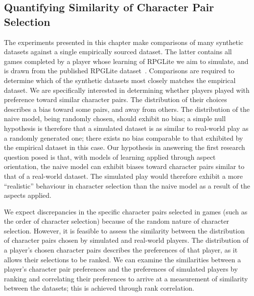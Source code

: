 \subsection{Quantifying Similarity of Character Pair Selection}
\label{measuring_charpair_similarity}

The experiments presented in this chapter make comparisons of many synthetic
datasets against a single empirically sourced dataset. The latter contains all games
completed by a player whose learning of RPGLite we aim to simulate, and is drawn
from the published RPGLite dataset~\cite{rpglite_dataset}. Comparisons are
required to determine which of the synthetic datasets most closely matches the
empirical dataset. We are specifically interested in determining whether players
played with preference toward similar character pairs. The distribution of their
choices describes a bias toward some pairs, and away from others. The
distribution of the naive model, being randomly chosen, should exhibit no bias;
a simple null hypothesis is therefore that a simulated dataset is as similar to
real-world play as a randomly generated one; there exists no bias comparable to
that exhibited by the empirical dataset in this case. Our hypothesis in
answering the first research question posed is that, with models of learning
applied through aspect orientation, the naive model can exhibit biases toward
character pairs similar to that of a real-world dataset. The simulated play
would therefore exhibit a more ``realistic'' behaviour in character selection
than the naive model as a result of the aspects applied.

We expect discrepancies in the specific character pairs selected in games (such
as the order of character selection) because of the random nature of character
selection. However, it is feasible to assess the similarity between the
distribution of character pairs chosen by simulated and real-world players. The
distribution of a player's chosen character pairs describes the preferences of
that player, as it allows their selections to be ranked. We can examine the
similarities between a player's character pair preferences and the preferences
of simulated players by ranking and correlating their preferences to arrive at a
measurement of similarity between the datasets; this is achieved through
rank correlation.

